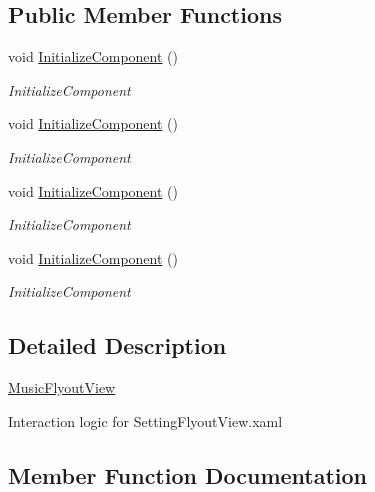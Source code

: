 \subsection*{Public Member Functions}
\begin{DoxyCompactItemize}
\item 
void \hyperlink{class_presentation_1_1_view_1_1_flyout_1_1_music_flyout_view_ae8007344b032def03546b7eed13aebef}{Initialize\+Component} ()
\begin{DoxyCompactList}\small\item\em Initialize\+Component \end{DoxyCompactList}\item 
void \hyperlink{class_presentation_1_1_view_1_1_flyout_1_1_music_flyout_view_ae8007344b032def03546b7eed13aebef}{Initialize\+Component} ()
\begin{DoxyCompactList}\small\item\em Initialize\+Component \end{DoxyCompactList}\item 
void \hyperlink{class_presentation_1_1_view_1_1_flyout_1_1_music_flyout_view_ae8007344b032def03546b7eed13aebef}{Initialize\+Component} ()
\begin{DoxyCompactList}\small\item\em Initialize\+Component \end{DoxyCompactList}\item 
void \hyperlink{class_presentation_1_1_view_1_1_flyout_1_1_music_flyout_view_ae8007344b032def03546b7eed13aebef}{Initialize\+Component} ()
\begin{DoxyCompactList}\small\item\em Initialize\+Component \end{DoxyCompactList}\end{DoxyCompactItemize}


\subsection{Detailed Description}
\hyperlink{class_presentation_1_1_view_1_1_flyout_1_1_music_flyout_view}{Music\+Flyout\+View} 

Interaction logic for Setting\+Flyout\+View.\+xaml 

\subsection{Member Function Documentation}
\mbox{\label{class_presentation_1_1_view_1_1_flyout_1_1_music_flyout_view_ae8007344b032def03546b7eed13aebef}} 
